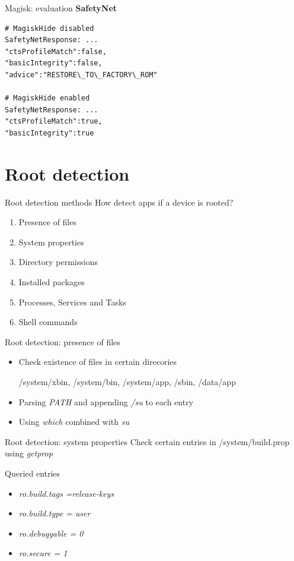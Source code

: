 \documentclass[
    11pt,%
    aspectratio=169,%
]{beamer}
\begin{document}
\begin{frame}[fragile]{Magisk: evaluation}
\textbf{SafetyNet}
\begin{verbatim}
# MagiskHide disabled
SafetyNetResponse: ...
"ctsProfileMatch":false,
"basicIntegrity":false,
"advice":"RESTORE\_TO\_FACTORY\_ROM"

# MagiskHide enabled
SafetyNetResponse: ...
"ctsProfileMatch":true,
"basicIntegrity":true
\end{verbatim}
\end{frame}


%
%
\section{Root detection}

\begin{frame}{Root detection methods}
How detect apps if a device is rooted?
  \begin{enumerate}
    \item Presence of files
    \item System properties
    \item Directory permissions
    \item Installed packages
    \item Processes, Services and Tasks
    \item Shell commands
  \end{enumerate}
\end{frame}


\begin{frame}{Root detection: presence of files}
\begin{itemize}
  \item Check existence of files in certain direcories

  /system/xbin, /system/bin, /system/app, /sbin, /data/app\newline
  \item Parsing \emph{PATH} and appending \emph{/su} to each entry
  \item Using \emph{which} combined with \emph{su}
\end{itemize}
\end{frame}


\begin{frame}{Root detection: system properties}
Check certain entries in \alert{/system/build.prop} using \emph{getprop}
\begin{exampleblock}{Queried entries}
\begin{itemize}
  \item \emph{ro.build.tags =release-keys}
  \item \emph{ro.build.type = user}
  \item \emph{ro.debuggable = 0}
  \item \emph{ro.secure = 1}
\end{itemize}
\end{exampleblock}
\end{frame}
\end{document}
